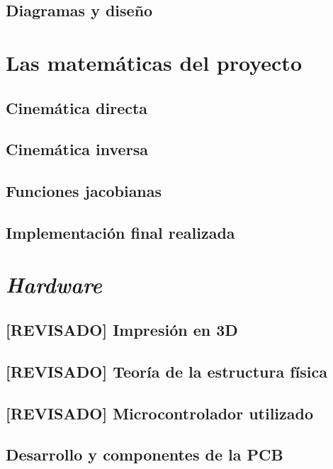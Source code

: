 \section{Diagramas y diseño}


\chapter{Las matemáticas del proyecto}
\label{chap:maths}

\section{Cinemática directa}

\section{Cinemática inversa}

\section{Funciones jacobianas}

\section{Implementación final realizada}


\chapter{\textit{Hardware}}
\label{chap:hardware}

\section{[REVISADO] Impresión en 3D}

\section{[REVISADO] Teoría de la estructura física}

\section{[REVISADO] Microcontrolador utilizado}

\section{Desarrollo y componentes de la PCB}

